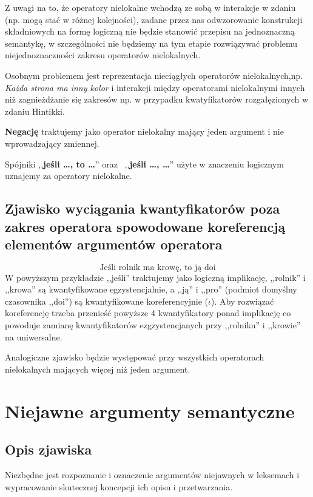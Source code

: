 \documentclass[a4paper, 12pt]{article}
\theoremstyle{remark}
\begin{document}
Z uwagi na to, że operatory nielokalne wchodzą ze sobą w interakcje w zdaniu (np. mogą stać w różnej kolejności),
zadane przez nas odwzorowanie konstrukcji składniowych na formę logiczną nie będzie stanowić przepisu na jednoznaczną semantykę,
w szczególności nie będziemy na tym etapie rozwiązywać problemu niejednoznaczności zakresu operatorów nielokalnych.

Osobnym problemem jest reprezentacja nieciągłych operatorów nielokalnych,np. \emph{Każda strona ma inny kolor} i interakcji między operatorami nielokalnymi innych niż zagnieżdżanie się zakresów
np. w przypadku kwatyfikatorów rozgałęzionych w zdaniu Hintikki.

\textbf{Negację} traktujemy jako operator nielokalny mający jeden argument i nie wprowadzający zmiennej.

Spójniki ,,\textbf{jeśli \dots, to \dots}'' oraz~ ,,\textbf{jeśli \dots, \dots}'' użyte w znaczeniu logicznym uznajemy za operatory nielokalne.



\subsection{Zjawisko wyciągania kwantyfikatorów poza zakres operatora spowodowane koreferencją elementów argumentów operatora}
\begin{equation}
	\text{Jeśli rolnik ma krowę, to ją doi}
\end{equation}
W powyższym przykładzie ,,jeśli'' traktujemy jako logiczną implikację, ,,rolnik'' i ,,krowa'' są kwantyfikowane egzystencjalnie, a 
,,ją'' i ,,pro'' (podmiot domyślny czasownika ,,doi'') są kwantyfikowane koreferencyjnie ($\iota$). 
Aby rozwiązać koreferencję trzeba przenieść powyższe 4 kwantyfikatory ponad implikację co powoduje
zamianę kwantyfikatorów  ezgzystencjanych przy ,,rolniku'' i ,,krowie'' na uniwersalne. 

Analogiczne zjawisko będzie występować przy wszystkich operatorach nielokalnych mających więcej niż jeden argument.

\section{Niejawne argumenty semantyczne} %
{
\renewcommand\thesection{}
\renewcommand\thesubsection{}
\setcounter{subsection}{-1}
\subsection{Opis zjawiska} %
\label{sub:definicja_robocza2}
}
Niezbędne jest rozpoznanie i oznaczenie argumentów niejawnych w leksemach i wypracowanie skutecznej koncepcji ich opisu i przetwarzania.
\end{document}
